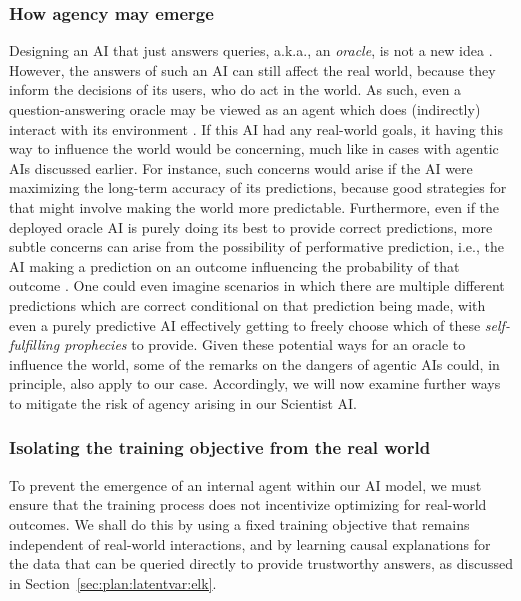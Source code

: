     \subsubsection{How agency may emerge}
    \label{sec:plan:angentising}  
        
Designing an AI that just answers queries, a.k.a., an \textit{oracle}, is not a new idea \cite{en.wikipedia.org.wiki.Superintelligence..Paths..Dangers..Strategies,link.springer.com.article.10.1007.s11023.012.9282.2,arxiv.org.abs.1711.05541}. However, the answers of such an AI can still affect the real world, because they inform the decisions of its users, who do act in the world. As such, even a question-answering oracle may be viewed as an agent which does (indirectly) interact with its environment \cite{arxiv.org.abs.1711.05541}. If this AI had any real-world goals, it having this way to influence the world would be concerning, much like in cases with agentic AIs discussed earlier. For instance, such concerns would arise if the AI were maximizing the long-term accuracy of its predictions, because good strategies for that might involve making the world more predictable. Furthermore, even if the deployed oracle AI is purely doing its best to provide correct predictions, more subtle concerns can arise from the possibility of performative prediction, i.e., the AI making a prediction on an outcome influencing the probability of that outcome \cite{proceedings.mlr.press.v119.perdomo20a.html}. One could even imagine scenarios in which there are multiple different predictions which are correct conditional on that prediction being made, with even a purely predictive AI effectively getting to freely choose which of these \textit{self-fulfilling prophecies} to provide. Given these potential ways for an oracle to influence the world, some of the remarks on the dangers of agentic AIs could, in principle, also apply to our case. Accordingly, we will now examine further ways to mitigate the risk of agency arising in our Scientist AI.


    \subsubsection{Isolating the training objective from the real world}
    
To prevent the emergence of an internal agent within our AI model, we must ensure that the training process does not incentivize optimizing for real-world outcomes. We shall do this by using a fixed training objective that remains independent of real-world interactions, and by learning causal explanations for the data that can be queried directly to provide trustworthy answers, as discussed in Section~\ref{sec:plan:latentvar:elk}.

